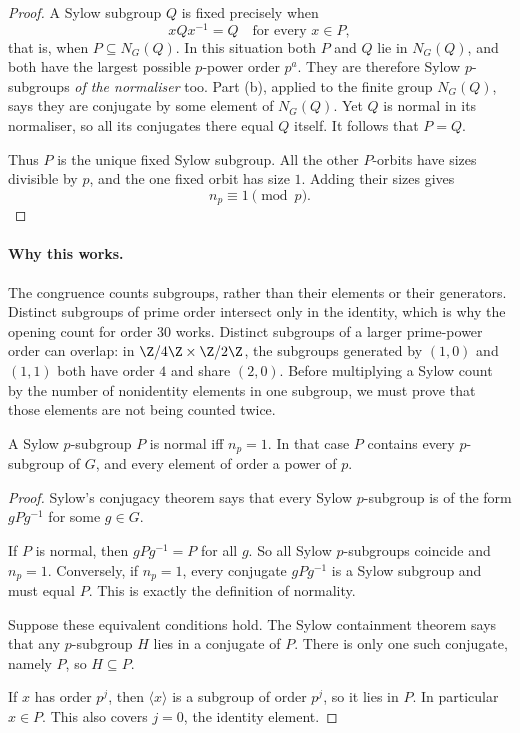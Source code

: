 \begin{proof}
A Sylow subgroup $Q$ is fixed precisely when
\[
xQx^{-1}=Q\quad\text{for every }x\in P,
\]
that is, when $P\subseteq N_G(Q)$. In this situation both $P$ and $Q$ lie in $N_G(Q)$, and both have the largest possible $p$-power order $p^a$. They are therefore Sylow $p$-subgroups \emph{of the normaliser} too. Part (b), applied to the finite group $N_G(Q)$, says they are conjugate by some element of $N_G(Q)$. Yet $Q$ is normal in its normaliser, so all its conjugates there equal $Q$ itself. It follows that $P=Q$.

Thus $P$ is the unique fixed Sylow subgroup. All the other $P$-orbits have sizes divisible by $p$, and the one fixed orbit has size $1$. Adding their sizes gives
\[
n_p\equiv1\pmod p.
\]
\end{proof}

\paragraph{Why this works.}
The congruence counts subgroups, rather than their elements or their generators. Distinct subgroups of prime order intersect only in the identity, which is why the opening count for order $30$ works. Distinct subgroups of a larger prime-power order can overlap: in $\Z/4\Z\times\Z/2\Z$, the subgroups generated by $(1,0)$ and $(1,1)$ both have order $4$ and share $(2,0)$. Before multiplying a Sylow count by the number of nonidentity elements in one subgroup, we must prove that those elements are not being counted twice.

\begin{corollary}\label{cor:sylownormal}
A Sylow $p$-subgroup $P$ is normal iff $n_p=1$. In that case $P$ contains every $p$-subgroup of $G$, and every element of order a power of $p$.
\end{corollary}
\begin{proof}
Sylow's conjugacy theorem says that every Sylow
$p$-subgroup is of the form $gPg^{-1}$ for some $g\in G$.

If $P$ is normal, then $gPg^{-1}=P$ for all $g$.
So all Sylow $p$-subgroups coincide and $n_p=1$.
Conversely, if $n_p=1$, every conjugate $gPg^{-1}$
is a Sylow subgroup and must equal $P$.
This is exactly the definition of normality.

Suppose these equivalent conditions hold.
The Sylow containment theorem says that any
$p$-subgroup $H$ lies in a conjugate of $P$.
There is only one such conjugate, namely $P$,
so $H\subseteq P$.

If $x$ has order $p^j$, then
$\langle x\rangle$ is a subgroup of
order $p^j$, so it lies in $P$.
In particular $x\in P$.
This also covers $j=0$, the identity element.
\end{proof}

